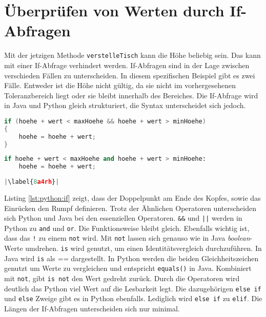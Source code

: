 \section{Überprüfen von Werten durch If-Abfragen}
Mit der jetzigen Methode \texttt{verstelleTisch} kann die Höhe beliebig sein. Das kann mit einer If-Abfrage verhindert werden. If-Abfragen sind in der Lage zwischen verschieden Fällen zu unterscheiden. In diesem spezifischen Beispiel gibt es zwei Fälle. Entweder ist die Höhe nicht gültig, da sie nicht im vorhergesehenen Toleranzbereich liegt oder sie bleibt innerhalb des Bereiches. Die If-Abfrage wird in Java und Python gleich strukturiert, die Syntax unterscheidet sich jedoch. \cite{Louis:2010}\cite{Python3:Buch}

\begin{minipage}{.5\linewidth}
\begin{lstlisting}[language=java,caption={If-Abfrage in Java},captionpos=b,label={lst:java:if},frame=none]
if (hoehe + wert < maxHoehe && hoehe + wert > minHoehe)
{
    hoehe = hoehe + wert;
}
\end{lstlisting}
\end{minipage}
\begin{minipage}{.5\linewidth}
\begin{lstlisting}[language=python,caption={If-Abfrage in Python},captionpos=b,label={lst:python:if},frame=l,escapechar=|]
if hoehe + wert < maxHoehe and hoehe + wert > minHoehe:
    hoehe = hoehe + wert;
    
|\label{8a4rh}|
\end{lstlisting}
\end{minipage}

Listing \ref{lst:python:if} zeigt, dass der Doppelpunkt am Ende des Kopfes, sowie das Einrücken den Rumpf definieren.
Trotz der Ähnlichen Operatoren unterscheiden sich Python und Java bei den essenziellen Operatoren. \texttt{\&\&} und \texttt{||} werden in Python zu \texttt{and} und \texttt{or}. Die Funktionsweise bleibt gleich. Ebenfalls wichtig ist, dass das \texttt{!} zu einem \texttt{not} wird. Mit \texttt{not} lassen sich genauso wie in Java \textit{boolean}-Werte umdrehen. \texttt{is} wird genutzt, um einen Identitätsvergleich durchzuführen. In Java wird \texttt{is} als \textit{==} dargestellt. In Python werden die beiden Gleichheitszeichen genutzt um Werte zu vergleichen und entspricht \texttt{equals()} in Java. Kombiniert mit \texttt{not}, gibt \texttt{is not} den Wert gedreht zurück. Durch die Operatoren wird deutlich das Python viel Wert auf die Lesbarkeit legt.
Die dazugehörigen \texttt{else if} und \texttt{else} Zweige gibt es in Python ebenfalls. Lediglich wird \texttt{else if} zu \texttt{elif}.  Die Längen der If-Abfragen unterscheiden sich nur minimal. \cite{Louis:2010}\cite{Python3:Buch}\par

